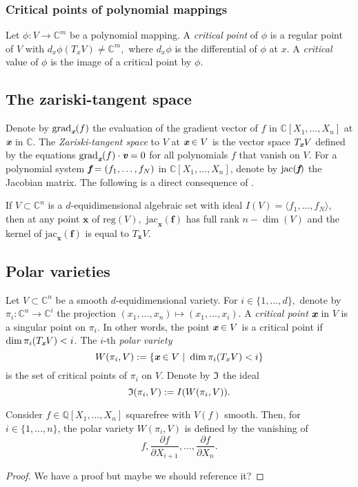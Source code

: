 \documentclass[sigconf]{acmart}
\def\xb{\textit{\textbf{x}}}
\def\C{\mathbb{C}}
\def\jac{ \textrm{jac}}
\def\grad{\textrm{grad}}
\def\reg{\textrm{reg}}
\def\pa{\partial}
\def\I{\frak{I}}
\begin{document}
\subsubsection{Critical points of polynomial mappings}
%
Let $\phi : V \rightarrow \C^m$ be a polynomial mapping. A \textit{critical point} of $\phi$ is a regular point of $V$ with $d_x \phi(T_xV) \not = \C^m,$ where $d_x \phi$ is the differential of $\phi$ at $x.$ A \textit{critical} value of $\phi$ is the image of a critical point by $\phi$.
%
\subsection{The zariski-tangent space}
%
Denote by $\grad_{\xb}(f)$ the evaluation of the gradient vector of $f$ in $\C[X_1,\hdots,X_n]$ at $\textit{\textbf{x}}$ in $\C$.
The \textit{Zariski-tangent space} to $V$ at $\textit{\textbf{x}} \in V$ is the vector space $T_{\xb}V$ defined by the equations $\grad_{\xb}(f) \cdot \textit{\textbf{v}}=0$ for all polynomials $f$ that vanish on $V$. For a polynomial system $\textit{\textbf{f}}=(f_1,\hdots,f_N)$ in $\C[X_1,\hdots,X_n]$, denote by $\jac(\textit{\textbf{f}})$ the Jacobian matrix.
The following is a direct consequence of \cite[Corollary 16.20]{ECA}.
%
\begin{proposition}
If $V \subset \C^n$ is a $d$-equidimensional algebraic set with ideal $I(V)=\langle f_1,\hdots,f_N \rangle$, then at any point $\textbf{x}$ of $\reg(V),$ $\jac_\textbf{x}(\textbf{f})$ has full rank $n - \dim(V)$ and the kernel of $\jac_\textbf{x}(\textbf{f})$ is equal to $T_\textbf{x}V.$ 
\end{proposition}
%
\subsection{Polar varieties}
%
Let $V\subset \C^n$ be a smooth $d$-equidimensional variety. For $i \in \{1,\hdots,d\},$ denote by $\pi_i:\C^n \rightarrow \C^i$ the projection
$(x_1,\hdots,x_n) \mapsto  (x_1,\hdots,x_i)$. A \textit{critical point} $\textit{\textbf{x}}$ in $V$ is a singular point on $\pi_i.$ In other words, the point $\textit{\textbf{x}} \in V$ is a critical point if $\dim \pi_i( T_\textit{\textbf{x}}V) < i$. The $i$-th  \textit{polar variety} \[W(\pi_i,V) := \{\textit{\textbf{x}} \in V~|~\dim \pi_i(T_xV) < i\}\] is the set of critical points of $\pi_i$ on $V$. Denote by $\I$ the ideal \[\frak{I}(\pi_i,V) := I(W(\pi_i,V)).\] 
%
\begin{proposition} 
Consider $f \in \mathbb{Q}[X_1,\hdots,X_n]$ squarefree with $V(f)$ smooth. Then, for $i \in \{1,\hdots,n\}$, the polar variety $W(\pi_i,V)$ is defined by the vanishing of \[f,\frac{\pa f}{\pa X_{i+1}},\hdots,\frac{\pa f}{\pa X_n}.\]
\end{proposition}
%
\begin{proof}
We have a proof but maybe we should reference it?
\end{proof}
%
\end{document}
